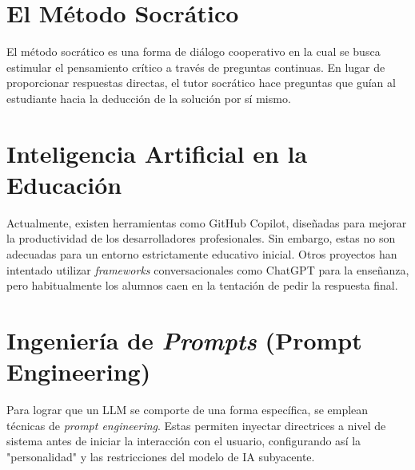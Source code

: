 \section{El Método Socrático}
El método socrático es una forma de diálogo cooperativo en la cual se busca estimular el pensamiento crítico a través de preguntas continuas. En lugar de proporcionar respuestas directas, el tutor socrático hace preguntas que guían al estudiante hacia la deducción de la solución por sí mismo.

\section{Inteligencia Artificial en la Educación}
Actualmente, existen herramientas como GitHub Copilot, diseñadas para mejorar la productividad de los desarrolladores profesionales. Sin embargo, estas no son adecuadas para un entorno estrictamente educativo inicial. Otros proyectos han intentado utilizar \textit{frameworks} conversacionales como ChatGPT para la enseñanza, pero habitualmente los alumnos caen en la tentación de pedir la respuesta final.

\section{Ingeniería de \textit{Prompts} (Prompt Engineering)}
Para lograr que un LLM se comporte de una forma específica, se emplean técnicas de \textit{prompt engineering}. Estas permiten inyectar directrices a nivel de sistema antes de iniciar la interacción con el usuario, configurando así la "personalidad" y las restricciones del modelo de IA subyacente.
